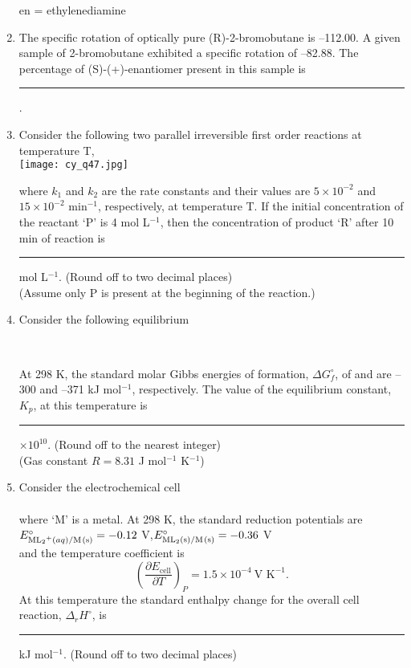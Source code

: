 \documentclass[12pt]{article}
\begin{document}
\begin{enumerate}[label=Q.\arabic*]
							\vspace{1ex}
							en = ethylenediamine

							\item The specific rotation of optically pure (R)-2-bromobutane is --112.00. A given sample of 2-bromobutane exhibited a specific rotation of --82.88. The percentage of (S)-(+)-enantiomer present in this sample is \rule{2cm}{0.15mm}.
							\item Consider the following two parallel irreversible first order reactions at temperature T,\\[1ex]
							\texttt{[image: cy\_q47.jpg]}

							\vspace{1ex}
							where $k_1$ and $k_2$ are the rate constants and their values are $5 \times 10^{-2}$ and $15 \times 10^{-2}$ min$^{-1}$, respectively, at temperature T. If the initial concentration of the reactant ‘P’ is 4 mol L$^{-1}$, then the concentration of product ‘R’ after 10 min of reaction is \rule{2cm}{0.15mm} mol L$^{-1}$. (Round off to two decimal places)\\

							(Assume only P is present at the beginning of the reaction.)

	\item Consider the following equilibrium\\[1ex]
		\begin{center}{
				\\[1ex]
		}\end{center}
	At 298 K, the standard molar Gibbs energies of formation, $\Delta G^\circ_f$, of  and  are --300 and --371 kJ mol$^{-1}$, respectively. The value of the equilibrium constant, $K_p$, at this temperature is \rule{2cm}{0.15mm} $\times 10^{10}$. (Round off to the nearest integer)\\[1ex]
(Gas constant $R = 8.31$ J mol$^{-1}$ K$^{-1}$)
	\item Consider the electrochemical cell\\[1ex]
	\\[1ex]
	where ‘M’ is a metal. At 298 K, the standard reduction potentials are\\
		$E^\circ_{\ce{ML2+}(aq)/\ce{M(s)}} = -0.12$ V,\quad $E^\circ_{\ce{ML2(s)}/\ce{M(s)}} = -0.36$ V\\
		and the temperature coefficient is\\
		\[
			\left(\frac{\partial E_{\text{cell}}}{\partial T}\right)_P = 1.5 \times 10^{-4}~\text{V K}^{-1}.
	\]
At this temperature the standard enthalpy change for the overall cell reaction, $\Delta_r H^\circ$, is \rule{2cm}{0.15mm} kJ mol$^{-1}$. (Round off to two decimal places)


\end{enumerate}
\end{document}
